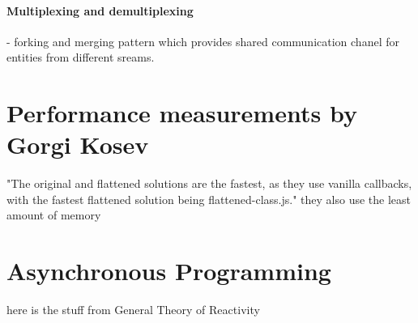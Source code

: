 \paragraph{Multiplexing and demultiplexing} - forking and merging pattern which provides shared communication chanel for entities from different sreams.\cite{nodejsbook}
\cite{nodejsbook}

\section{Performance measurements by Gorgi Kosev}
"The original and flattened solutions are the fastest, as they use vanilla callbacks, with the fastest flattened solution being flattened-class.js." they also use the least amount of memory\cite{asyncPerformance}

\section{Asynchronous Programming}
here is the stuff from General Theory of Reactivity
